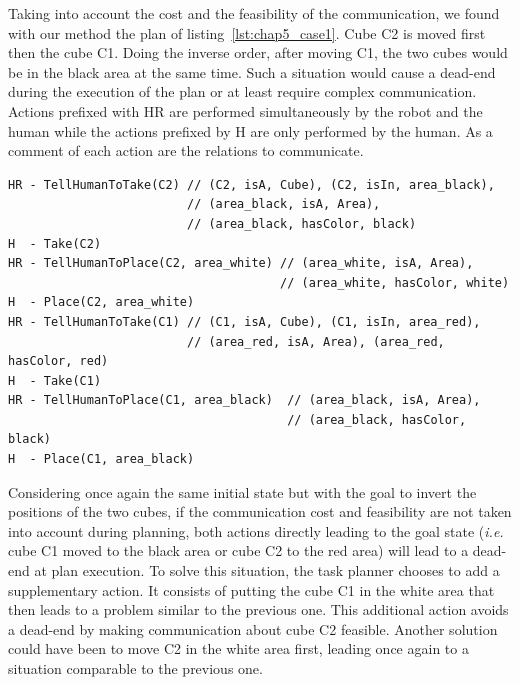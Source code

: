 Taking into account the cost and the feasibility of the communication, we found with our method the plan of listing~\ref{lst:chap5_case1}. Cube C2 is moved first then the cube C1. Doing the inverse order, after moving C1, the two cubes would be in the black area at the same time. Such a situation would cause a dead-end during the execution of the plan or at least require complex communication. Actions prefixed with HR are performed simultaneously by the robot and the human while the actions prefixed by H are only performed by the human. As a comment of each action are the relations to communicate.

\begin{lstlisting}[frame=single, basicstyle=\scriptsize\ttfamily, label={lst:chap5_case1}, caption={The obtained plan for the first case study where cube C1 must be moved from the red to the black area and cube C2 moved from the black to the white area. The lines beginning with H represent the actions of the human and the lines beginning with HR represent actions involving the human and the robot (communication actions). In green are the \acrshort{reg} results for each communication action.}, captionpos=b, style=HatpPlan]
HR - TellHumanToTake(C2) // (C2, isA, Cube), (C2, isIn, area_black), 
                         // (area_black, isA, Area), 
                         // (area_black, hasColor, black)
H  - Take(C2)
HR - TellHumanToPlace(C2, area_white) // (area_white, isA, Area),
                                      // (area_white, hasColor, white)
H  - Place(C2, area_white)
HR - TellHumanToTake(C1) // (C1, isA, Cube), (C1, isIn, area_red), 
                         // (area_red, isA, Area), (area_red, hasColor, red)
H  - Take(C1)
HR - TellHumanToPlace(C1, area_black)  // (area_black, isA, Area),
                                       // (area_black, hasColor, black)
H  - Place(C1, area_black)
\end{lstlisting}

Considering once again the same initial state but with the goal to invert the positions of the two cubes, if the communication cost and feasibility are not taken into account during planning, both actions directly leading to the goal state (\textit{i.e.} cube C1 moved to the black area or cube C2 to the red area) will lead to a dead-end at plan execution. To solve this situation, the task planner chooses to add a supplementary action. It consists of putting the cube C1 in the white area that then leads to a problem similar to the previous one. This additional action avoids a dead-end by making communication about cube C2 feasible. Another solution could have been to move C2 in the white area first, leading once again to a situation comparable to the previous one.

